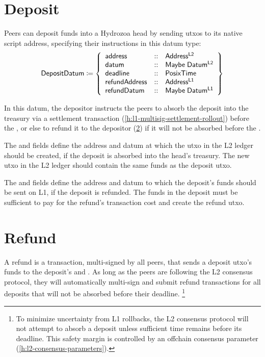 \documentclass[../hydrozoa.tex]{subfiles}
\begin{document}
\section{Deposit}%
\label{h:l1-multisig-deposit}%

Peers can deposit funds into a Hydrozoa head by sending utxos to its native script address, specifying their instructions in this datum type:
\begin{equation*}
  \mathsf{DepositDatum} \coloneq \left\{
  \begin{array}{lll}
    \mathsf{address} &::& \mathsf{Address^{L2}} \\
    \mathsf{datum} &::& \mathsf{Maybe \; Datum^{L2}} \\
    \mathsf{deadline} &::& \mathsf{PosixTime} \\
    \mathsf{refundAddress} &::& \mathsf{Address^{L1}} \\
    \mathsf{refundDatum} &::& \mathsf{Maybe \; Datum^{L1}}
  \end{array}\right\}
\end{equation*}

In this datum, the depositor instructs the peers to absorb the deposit into the treasury via a settlement transaction (\cref{h:l1-multisig-settlement-rollout}) before the , or else to refund it to the depositor (\cref{h:l1-multisig-refund}) if it will not be absorbed before the .

The  and  fields define the address and datum at which the utxo in the L2 ledger should be created, if the deposit is absorbed into the head's treasury.
The new utxo in the L2 ledger should contain the same funds as the deposit utxo.

The  and  fields define the address and datum to which the deposit's funds should be sent on L1, if the deposit is refunded.
The funds in the deposit must be sufficient to pay for the refund's transaction cost and create the refund utxo.

\section{Refund}%
\label{h:l1-multisig-refund}%

A refund is a transaction, multi-signed by all peers, that sends a deposit utxo's funds to the deposit's  and .
As long as the peers are following the L2 consensus protocol, they will automatically multi-sign and submit refund transactions for all deposits that will not be absorbed before their deadline.%
\footnote{To minimize uncertainty from L1 rollbacks, the L2 consensus protocol will not attempt to absorb a deposit unless sufficient time remains before its deadline. This safety margin is controlled by an offchain consensus parameter (\cref{h:l2-consensus-parameters}).}
\end{document}
